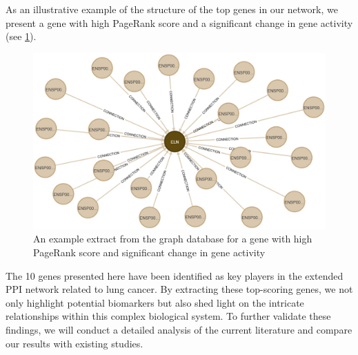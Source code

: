 As an illustrative example of the structure of the top genes in our network,
we present a gene with high PageRank score and a significant change in gene activity
(see \cref{fig:04_example_gene}).\\

\begin{figure}[h]
    \centering
    \includegraphics[height=\dfheightdouble]{figures/04_example_gene}
    \caption{An example extract from the graph database for a gene with high PageRank score and significant change in gene activity}
    \label{fig:04_example_gene}
\end{figure}

The 10 genes presented here have been identified as key players in the extended PPI network related to lung cancer.
By extracting these top-scoring genes, we not only highlight potential biomarkers but also
shed light on the intricate relationships within this complex biological system.
To further validate these findings, we will conduct a detailed analysis of the current literature and compare our results with existing studies.
